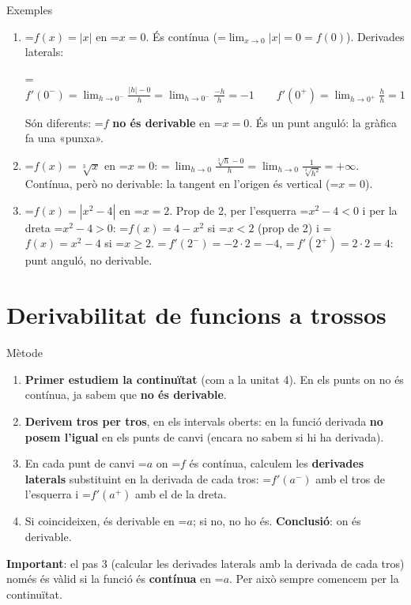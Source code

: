 \documentclass[11pt,a4paper]{article}
\newcommand{\lt}{<}\newcommand{\gt}{>}
\newcommand{\fmm}[1]{\setbox0=\hbox{$#1$}\ifdim\wd0>\linewidth\[#1\]\else\mbox{\box0}\fi}
\newcommand{\fmuline}[1]{\textbf{\color{fmaccent}#1}}
\begin{document}
  
\begin{fmex}{Exemples}
\begin{enumerate}[label=\textbf{\arabic*.},leftmargin=*]
\item \fmm{f(x)=|x|} en \fmm{x=0}. És contínua (\fmm{\lim_{x\to0}|x|=0=f(0)}). Derivades laterals:
          

            

\fmm{f'(0^-)=\displaystyle\lim_{h\to0^-}\frac{|h|-0}{h}=\lim_{h\to0^-}\frac{-h}{h}=-1\qquad f'(0^+)=\lim_{h\to0^+}\frac{h}{h}=1}

            

Són diferents: \fmm{f} \textbf{no és derivable} en \fmm{x=0}. És un punt anguló: la gràfica fa una «punxa».
\item \fmm{f(x)=\sqrt[3]{x}} en \fmm{x=0}: \fmm{\ \displaystyle\lim_{h\to0}\frac{\sqrt[3]{h}-0}{h}=\lim_{h\to0}\frac{1}{\sqrt[3]{h^2}}=+\infty}. Contínua, però no derivable: la tangent en l'origen és vertical (\fmm{x=0}).
\item \fmm{f(x)=|x^2-4|} en \fmm{x=2}. Prop de 2, per l'esquerra \fmm{x^2-4\lt0} i per la dreta \fmm{x^2-4\gt0}: \fmm{f(x)=4-x^2} si \fmm{x\lt2} (prop de 2) i \fmm{f(x)=x^2-4} si \fmm{x\geq2}. \fmm{\ f'(2^-)=-2\cdot2=-4}, \fmm{\ f'(2^+)=2\cdot2=4}: punt anguló, no derivable.
\end{enumerate}
\end{fmex}

  
\section{Derivabilitat de funcions a trossos}\hypertarget{sec8}{}

  

  
\begin{fmdef}{Mètode}
\begin{enumerate}
\item \textbf{Primer estudiem la continuïtat} (com a la unitat 4). En els punts on no és contínua, ja sabem que \textbf{no és derivable}.
\item \textbf{Derivem tros per tros}, en els intervals oberts: en la funció derivada \textbf{no posem l'igual} en els punts de canvi (encara no sabem si hi ha derivada).
\item En cada punt de canvi \fmm{a} on \fmm{f} és contínua, calculem les \textbf{derivades laterals} substituint en la derivada de cada tros: \fmm{f'(a^-)} amb el tros de l'esquerra i \fmm{f'(a^+)} amb el de la dreta.
\item Si coincideixen, és derivable en \fmm{a}; si no, no ho és. \textbf{Conclusió}: on és derivable.
\end{enumerate}

      
\begin{fmnote}\fmuline{Important}: el pas 3 (calcular les derivades laterals amb la derivada de cada tros) només és vàlid si la funció és \textbf{contínua} en \fmm{a}. Per això sempre comencem per la continuïtat.\end{fmnote}
\end{fmdef}
\end{document}

